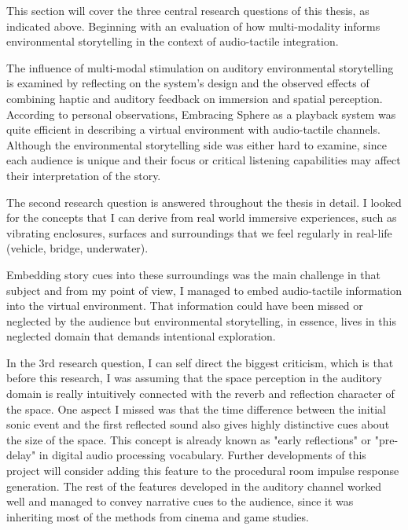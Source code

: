         This section will cover the three central research questions of this thesis, as indicated above. Beginning with an evaluation of how multi-modality informs environmental storytelling in the context of audio-tactile integration.\par

        The influence of multi-modal stimulation on auditory environmental storytelling is examined by reflecting on the system’s design and the observed effects of combining haptic and auditory feedback on immersion and spatial perception. According to personal observations, Embracing Sphere as a playback system was quite efficient in describing a virtual environment with audio-tactile channels. Although the environmental storytelling side was either hard to examine, since each audience is unique and their focus or critical listening capabilities may affect their interpretation of the story.\par

        The second research question is answered throughout the thesis in detail. I looked for the concepts that I can derive from real world immersive experiences, such as vibrating enclosures, surfaces and surroundings that we feel regularly in real-life (vehicle, bridge, underwater).\par

        Embedding story cues into these surroundings was the main challenge in that subject and from my point of view, I managed to embed audio-tactile information into the virtual environment. That information could have been missed or neglected by the audience but environmental storytelling, in essence, lives in this neglected domain that demands intentional exploration.\par

        In the 3rd research question, I can self direct the biggest criticism, which is that before this research, I was assuming that the space perception in the auditory domain is really intuitively connected with the reverb and reflection character of the space. One aspect I missed was that the time difference between the initial sonic event and the first reflected sound also gives highly distinctive cues about the size of the space. This concept is already known as "early reflections" or "pre-delay" in digital audio processing vocabulary. Further developments of this project will consider adding this feature to the procedural room impulse response generation. The rest of the features developed in the auditory channel worked well and managed to convey narrative cues to the audience, since it was inheriting most of the methods from cinema and game studies.\par

